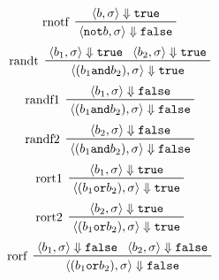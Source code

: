 \documentclass[a4paper, 11pt, accentcolor = tud3b]{tudreport}
\begin{document}
\begin{multicols}{2}
					    \begin{equation*}
						    \prftree[l]
							    { rnotf }
							    { \langle b, \sigma \rangle \Downarrow \texttt{true} }
							    { \langle \texttt{not} b, \sigma \rangle \Downarrow \texttt{false} }
					    \end{equation*}
					    \begin{equation*}
						    \prftree[l]
							    { randt }
							    { \langle b _ 1, \sigma \rangle \Downarrow \texttt{true} }
							    { \langle b _ 2, \sigma \rangle \Downarrow \texttt{true} }
							    { \langle (b _ 1 \texttt{and} b _ 2), \sigma \rangle \Downarrow \texttt{true} }
					    \end{equation*}
					    \begin{equation*}
						    \prftree[l]
							    { randf1 }
							    { \langle b _ 1, \sigma \rangle \Downarrow \texttt{false} }
							    { \langle (b _ 1 \texttt{and} b _ 2), \sigma \rangle \Downarrow \texttt{false} }
					    \end{equation*}
					    \begin{equation*}
						    \prftree[l]
							    { randf2 }
							    { \langle b _ 2, \sigma \rangle \Downarrow \texttt{false} }
							    { \langle (b _ 1 \texttt{and} b _ 2), \sigma \rangle \Downarrow \texttt{false} }
					    \end{equation*}
					    \begin{equation*}
						    \prftree[l]
							    { rort1 }
							    { \langle b _ 1, \sigma \rangle \Downarrow \texttt{true} }
							    { \langle (b _ 1 \texttt{or} b _ 2), \sigma \rangle \Downarrow \texttt{true} }
					    \end{equation*}
					    \begin{equation*}
						    \prftree[l]
							    { rort2 }
							    { \langle b _ 2, \sigma \rangle \Downarrow \texttt{true} }
							    { \langle (b _ 1 \texttt{or} b _ 2), \sigma \rangle \Downarrow \texttt{true} }
					    \end{equation*}
					    \begin{equation*}
						    \prftree[l]
							    { rorf }
							    { \langle b _ 1, \sigma \rangle \Downarrow \texttt{false} }
							    { \langle b _ 2, \sigma \rangle \Downarrow \texttt{false} }
							    { \langle (b _ 1 \texttt{or} b _ 2), \sigma \rangle \Downarrow \texttt{false} }
					    \end{equation*}
				    \end{multicols}
			    
\end{document}
